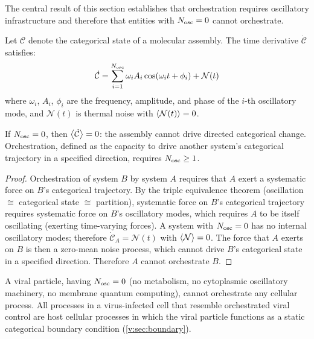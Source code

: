 The central result of this section establishes that orchestration requires oscillatory infrastructure and therefore that entities with $N_{\mathrm{osc}} = 0$ cannot orchestrate.

\begin{theorem}
\label{v:thm:OIT}
Let $\mathcal{C}$ denote the categorical state of a molecular assembly. The time derivative $\dot{\mathcal{C}}$ satisfies:
\begin{equation}
  \dot{\mathcal{C}} = \sum_{i=1}^{N_{\mathrm{osc}}} \omega_i A_i \cos(\omega_i t + \phi_i) + \mathcal{N}(t)
  \label{v:eq:Cdot}
\end{equation}
where $\omega_i$, $A_i$, $\phi_i$ are the frequency, amplitude, and phase of the $i$-th oscillatory mode, and $\mathcal{N}(t)$ is thermal noise with $\left\langle \mathcal{N}(t) \right\rangle = 0$.

If $N_{\mathrm{osc}} = 0$, then $\left\langle \dot{\mathcal{C}} \right\rangle = 0$: the assembly cannot drive directed categorical change. Orchestration, defined as the capacity to drive another system's categorical trajectory in a specified direction, requires $N_{\mathrm{osc}} \geq 1$.
\end{theorem}

\begin{proof}
Orchestration of system $B$ by system $A$ requires that $A$ exert a systematic force on $B$'s categorical trajectory. By the triple equivalence theorem (oscillation $\cong$ categorical state $\cong$ partition), systematic force on $B$'s categorical trajectory requires systematic force on $B$'s oscillatory modes, which requires $A$ to be itself oscillating (exerting time-varying forces). A system with $N_{\mathrm{osc}} = 0$ has no internal oscillatory modes; therefore $\dot{\mathcal{C}}_A = \mathcal{N}(t)$ with $\left\langle \mathcal{N} \right\rangle = 0$. The force that $A$ exerts on $B$ is then a zero-mean noise process, which cannot drive $B$'s categorical state in a specified direction. Therefore $A$ cannot orchestrate $B$.
\end{proof}

\begin{corollary}
\label{v:cor:viral_impossibility}
A viral particle, having $N_{\mathrm{osc}} = 0$ (no metabolism, no cytoplasmic oscillatory machinery, no membrane quantum computing), cannot orchestrate any cellular process. All processes in a virus-infected cell that resemble orchestrated viral control are host cellular processes in which the viral particle functions as a static categorical boundary condition (\cref{v:sec:boundary}).
\end{corollary}

